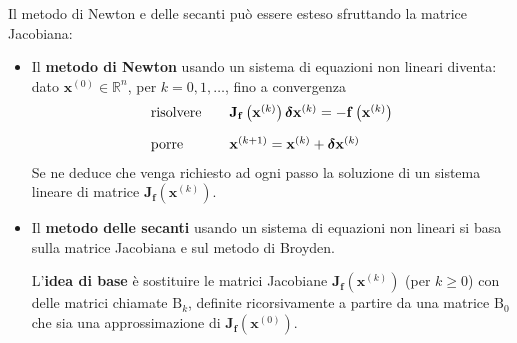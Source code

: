 \noindent
Il metodo di Newton e delle secanti può essere esteso sfruttando la matrice Jacobiana:
\begin{itemize}
    \item Il \textbf{metodo di Newton} usando un sistema di equazioni non lineari diventa: dato $\mathbf{x}^{\left(0\right)} \in \mathbb{R}^{n}$, per $k = 0, 1, \dots$, fino a convergenza
    \begin{equation}\label{eq: metodo di Newton in un sistema non lineare}
        \begin{array}{l c l}
            \text{risolvere}&& \mathbf{J}_{\mathbf{f}}\left(\mathbf{x}^{\left(k\right)}\right)\boldsymbol{\delta} \mathbf{x}^{\left(k\right)} = -\mathbf{f}\left(\mathbf{x}^{\left(k\right)}\right) \\ [1em]
            \text{porre}    && \mathbf{x}^{\left(k+1\right)} = \mathbf{x}^{\left(k\right)} + \boldsymbol{\delta}\mathbf{x}^{\left(k\right)}
        \end{array}
    \end{equation}
    Se ne deduce che venga richiesto ad ogni passo la soluzione di un sistema lineare di matrice $\mathbf{J}_{\mathbf{f}}\left(\mathbf{x}^{\left(k\right)}\right)$.

    \item Il \textbf{metodo delle secanti} usando un sistema di equazioni non lineari si basa sulla matrice Jacobiana e sul metodo di Broyden.

    L'\textbf{idea di base} è sostituire le matrici Jacobiane $\mathbf{J}_{\mathbf{f}}\left(\mathbf{x}^{\left(k\right)}\right)$ (per $k \ge 0$) con delle matrici chiamate $\mathrm{B}_{k}$, definite ricorsivamente a partire da una matrice $\mathrm{B}_{0}$ che sia una approssimazione di $\mathbf{J}_{\mathbf{f}}\left(\mathbf{x}^{\left(0\right)}\right)$.


\end{itemize}
